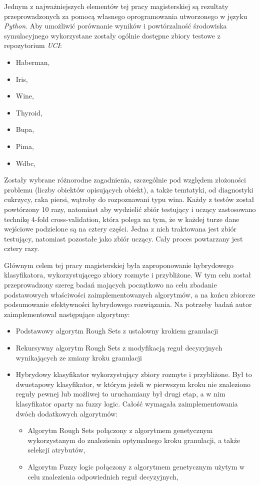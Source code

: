 Jednym z najważniejszych elementów tej pracy magisterskiej są rezultaty
przeprowadzonych za pomocą własnego oprogramowania utworzonego w języku
\textit{Python}. 
Aby umożliwić porównanie wyników i powtórzalność środowiska symulacyjnego
wykorzystane zostały ogólnie dostępne zbiory testowe z repozytorium \textit{UCI}:
\begin{itemize}
    \item Haberman,
    \item Iris,
    \item Wine, 
    \item Thyroid,
    \item Bupa, 
    \item Pima, 
    \item Wdbc,
\end{itemize}
Zostały wybrane różnorodne zagadnienia, szczególnie pod względem złożoności
problemu (liczby obiektów opisujących obiekt), a także temtatyki, od
diagnostyki cukrzycy, raka piersi, wątroby do rozpoznawani typu wina. Każdy z
testów został powtórzony 10 razy, natomiast aby wydzielić zbiór testujący i
uczący zastosowano technikę 4-fold cross-validation, która polega na tym, że w
każdej turze dane wejściowe podzielone są na cztery części. Jedna z nich
traktowana jest zbiór testujący, natomiast pozostałe jako zbiór uczący. Cały
proces powtarzany jest cztery razy.

Głównym celem tej pracy magisterskiej była zaproponowanie hybrydowego
klasyfikatora, wykorzystującego zbiory rozmyte i przybliżone. W tym celu
został przeprowadzony szereg badań mających początkowo na celu zbadanie
podstawowych właściwości zaimplementowanych algorytmów, a na końcu zbiorcze
podsumowanie efektywności hybrydowego rozwiązania. Na potrzeby badań autor
zaimplementował następujące algorytmy:
\begin{itemize}
    \item Podstawowy algorytm Rough Sets z ustalowny krokiem granulacji
    \item Rekursywny algorytm Rough Sets z modyfikacją reguł decyzyjnych
        wynikających ze zmiany kroku granulacji
    \item Hybrydowy klasyfikator wykorzystujący zbiory rozmyte i przybliżone.
        Był to dwuetapowy klasyfikator, w którym jeżeli w pierwszym kroku nie
        znaleziono reguły pewnej lub możliwej to uruchamiany był drugi etap, a
        w nim klasyfikator oparty na fuzzy logic. Całość wymagała
        zaimplementowania dwóch dodatkowych algorytmów:
        \begin{itemize}
            \item Algorytm Rough Sets połączony z algorytmem genetycznym
                wykorzystanym do znalezienia optymalnego kroku granulacji, a
                także selekcji atrybutów,
            \item Algorytm Fuzzy logic połączony z algorytmem genetycznym
                użytym w celu znalezienia odpowiednich reguł decyzyjnych,
        \end{itemize}
\end{itemize}
